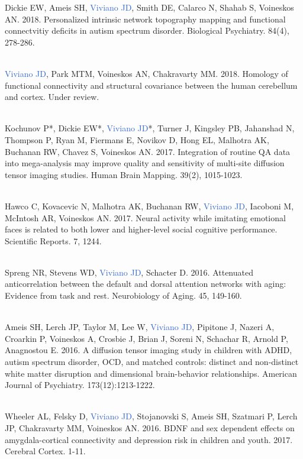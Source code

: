 \documentclass[a4paper,11pt,oneside]{book}
\begin{document}
\begin{flushleft}
Dickie EW, Ameis SH, \textcolor{highlight}{Viviano JD}, Smith DE, Calarco N, Shahab S, Voineskos AN. 2018. Personalized intrinsic network topography mapping and functional connectvitiy deficits in autism spectrum disorder. Biological Psychiatry. 84(4), 278-286. \\\

\textcolor{highlight}{Viviano JD}, Park MTM, Voineskos AN, Chakravarty MM. 2018. Homology of functional connectivity and structural covariance between the human cerebellum and cortex. Under review. \\\

Kochunov P*, Dickie EW*, \textcolor{highlight}{Viviano JD}*, Turner J, Kingsley PB, Jahanshad N, Thompson P, Ryan M, Fiermans E, Novikov D, Hong EL, Malhotra AK, Buchanan RW, Chavez S, Voineskos AN. 2017. Integration of routine QA data into mega-analysis may improve quality and sensitivity of multi-site diffusion tensor imaging studies. Human Brain Mapping. 39(2), 1015-1023. \\\

Hawco C, Kovacevic N, Malhotra AK, Buchanan RW, \textcolor{highlight}{Viviano JD}, Iacoboni M, McIntosh AR, Voineskos AN. 2017. Neural activity while imitating emotional faces is related to both lower and higher-level social cognitive performance. Scientific Reports. 7, 1244. \\\

Spreng NR, Stevens WD, \textcolor{highlight}{Viviano JD}, Schacter D. 2016. Attenuated anticorrelation between the default and dorsal attention networks with aging: Evidence from task and rest. Neurobiology of Aging. 45, 149-160. \\\

Ameis SH, Lerch JP, Taylor M, Lee W, \textcolor{highlight}{Viviano JD}, Pipitone J, Nazeri A, Croarkin P, Voineskos A, Crosbie J, Brian J, Soreni N, Schachar R, Arnold P, Anagnostou E. 2016. A diffusion tensor imaging study in children with ADHD, autism spectrum disorder, OCD, and matched controls: distinct and non-distinct white matter disruption and dimensional brain-behavior relationships. American Journal of Psychiatry. 173(12):1213-1222. \\\

Wheeler AL, Felsky D, \textcolor{highlight}{Viviano JD}, Stojanovski S, Ameis SH, Szatmari P, Lerch JP, Chakravarty MM, Voineskos AN. 2016. BDNF and sex dependent effects on amygdala-cortical connectivity and depression risk in children and youth. 2017. Cerebral Cortex. 1-11. \\\


\end{flushleft}
\end{document}
